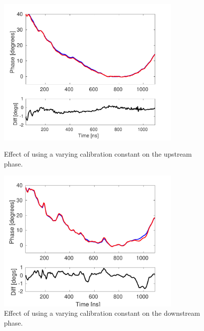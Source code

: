 \begin{figure}
  \centering
  \includegraphics[width=0.8\textwidth]{Figures/phaseMons/multiSampMon2Along}
  \caption{Effect of using a varying calibration constant on the upstream phase.}
  \label{f:multiSampMon2Along}
  \includegraphics[width=0.8\textwidth]{Figures/phaseMons/multiSampMon3Along}
  \caption{Effect of using a varying calibration constant on the downstream phase.}
  \label{f:multiSampMon3Along}
\end{figure}





